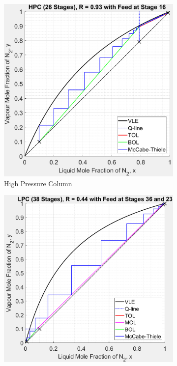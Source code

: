     \begin{figure}[ht]
        \begin{subfigure}{0.49\textwidth}
            \includegraphics[width=\linewidth]{airseparation/handouts/graphics/HPC_v0a.jpg}
            \caption{High Pressure Column}
            \label{fig:HPC_v0}
        \end{subfigure}
        \hspace*{\fill} %
        \begin{subfigure}{0.49\textwidth}
            \includegraphics[width=\linewidth]{airseparation/handouts/graphics/LPC_v0a.jpg}

\end{subfigure}
\end{figure}

